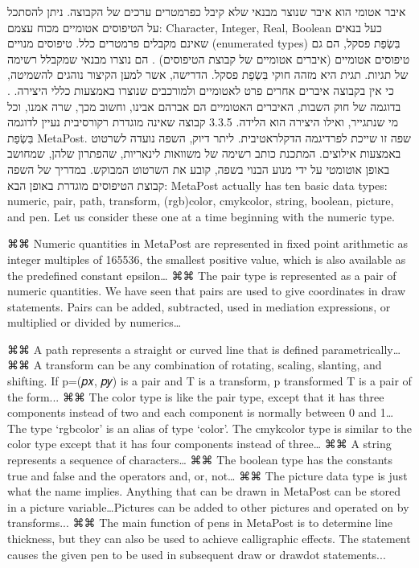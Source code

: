 איבר אטומי הוא איבר שנוצר מבנאי שלא קיבל כפרמטרים ערכים של הקבוצה.
ניתן להסתכל על הטיפוסים אטומיים מכוח עצמם: Character, Integer, Real, Boolean כעל בנאים שאינם מקבלים פרמטרים כלל.
טיפוסים מנויים (enumerated types) בִּשְׂפַת פסקל, הם גם טיפוסים אטומיים (איברים אטומיים של קבוצת הטיפוסים) . הם נוצרו מבנאי שמקבלל רשימה של תגיות. תגית היא מזהה חוקי בִּשְׂפַת פסקל.
הדרישה, אשר למען הקיצור נוהגים להשמיטה, כי אין בקבוצה איברים אחרים פרט לאטומיים ולמורכבים שנוצרו באמצעות כללי היצירה. .
בדוגמה של חוק השבות, האיברים האטומיים הם אברהם אבינו, וחשוב מכך, שרה אמנו, וכל מי שנתגייר, ואילו היצירה הוא הלידה.
​3.3.5​ קבוצה שאינה מוגדרת רקורסיבית
נעיין לדוגמה בִּשְׂפַת MetaPost. שפה זו שייכת לפרדיגמה הדקלראטיבית. ליתר דיוק, השפה נועדה לשרטוט באמצעות אילוצים. המתכנת כותב רשימה של משוואות לינאריות, שהפתרון שלהן, שמחושב באופן אוטומטי על ידי מנוע הבנוי בשפה, קובע את השרטוט המבוקש.
 במדריך של השפה קבוצת הטיפוסים מוגדרת באופן הבא:
MetaPost actually has ten basic data types: numeric, pair, path, transform, (rgb)color, cmykcolor, string, boolean, picture, and pen. Let us consider these one at a time beginning with the numeric type.
\begin{itemize}
⌘⌘
Numeric quantities in MetaPost are represented in fixed point arithmetic as integer multiples of 165536, the smallest positive value, which is also available as the predefined constant epsilon…
⌘⌘
The pair type is represented as a pair of numeric quantities. We have seen that pairs are used to give coordinates in draw statements. Pairs can be added, subtracted, used in mediation expressions, or multiplied or divided by numerics…

⌘⌘ A path represents a straight or curved line that is defined parametrically…
⌘⌘ A transform can be any combination of rotating, scaling, slanting, and shifting. If p=(𝑝𝑥, 𝑝𝑦) is a pair and T is a transform,
                                       p transformed T
is a pair of the form...
⌘⌘ The color type is like the pair type, except that it has three components instead of two and each component is normally between 0 and 1…The type ‘rgbcolor’ is an alias of type ‘color’.
The cmykcolor type is similar to the color type except that it has four components instead of three…
⌘⌘ A string represents a sequence of characters…
⌘⌘ The boolean type has the constants true and false and the operators and, or, not…
⌘⌘ The picture data type is just what the name implies. Anything that can be drawn in MetaPost can be stored in a picture variable…Pictures can be added to other pictures and operated on by transforms...
⌘⌘ The main function of pens in MetaPost is to determine line thickness, but they can also be used to achieve calligraphic effects. The statement
 causes the given pen to be used in subsequent draw or drawdot statements...
\end{itemize}
